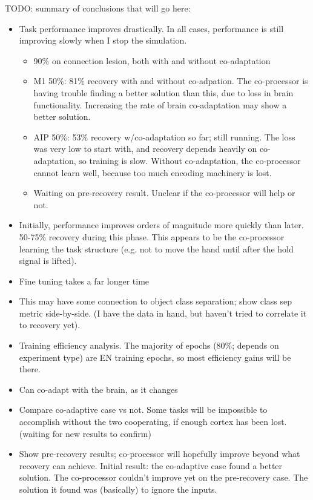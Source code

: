 \documentclass[12pt]{iopart}
\begin{document}
TODO: summary of conclusions that will go here:
\begin{itemize}
	\item Task performance improves drastically. In all cases, performance is still improving slowly when I stop the simulation.
		\begin{itemize}
			\item 90\% on connection lesion, both with and without co-adaptation
			\item M1 50\%: 81\% recovery with and without co-adpation. The co-processor is having trouble finding a better solution than this, due to loss in brain functionality. Increasing the rate of brain co-adaptation may show a better solution.
			\item AIP 50\%: 53\% recovery w/co-adaptation so far; still running. The loss was very low to start with, and recovery depends heavily on co-adaptation, so training is slow. Without co-adaptation, the co-processor cannot learn well, because too much encoding machinery is lost.
			\item Waiting on pre-recovery result. Unclear if the co-processor will help or not.
		\end{itemize}
	\item Initially, performance improves orders of magnitude more quickly than later. 50-75\% recovery during this phase. This appears to be the co-processor learning the task structure (e.g. not to move the hand until after the hold signal is lifted).
	\item Fine tuning takes a far longer time
	\item This may have some connection to object class separation; show class sep metric side-by-side. (I have the data in hand, but haven't tried to correlate it to recovery yet).
	\item Training efficiency analysis. The majority of epochs (80\%; depends on experiment type) are EN training epochs, so most efficiency gains will be there.
	\item Can co-adapt with the brain, as it changes
	\item Compare co-adaptive case vs not. Some tasks will be impossible to accomplish without the two cooperating, if enough cortex has been lost. (waiting for new results to confirm)
	\item Show pre-recovery results; co-processor will hopefully improve beyond what recovery can achieve. Initial result: the co-adaptive case found a better solution. The co-processor couldn't improve yet on the pre-recovery case. The solution it found was (basically) to ignore the inputs.
\end{itemize}
\end{document}
